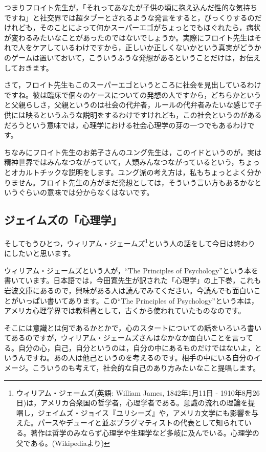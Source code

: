 \documentclass{ltjsbook}
\begin{document}
つまりフロイト先生が，「それってあなたが子供の頃に抱え込んだ性的な気持ちですね」と社交界では超タブーとされるような発言をすると，びっくりするのだけれども，そのことによって何かスーパーエゴがちょっとでもほぐれたら，病状が変わるみたいなことがあったのではないでしょうか。実際にフロイト先生はそれで人をケアしているわけですから，正しいか正しくないかという真実がどうかのゲームは置いておいて，こういうふうな発想があるということだけは，お伝えしておきます。

さて，フロイト先生もこのスーパーエゴというところに社会を見出しているわけですね。彼は臨床で個々のケースについての発想の人ですから，どちらかというと父親らしさ，父親というのは社会の代弁者，ルールの代弁者みたいな感じで子供には映るというふうな説明をするわけですけれども，この社会というのがあるだろうという意味では，心理学における社会心理学の芽の一つでもあるわけです。

ちなみにフロイト先生のお弟子さんのユング先生は，このイドというのが，実は精神世界ではみんなつながっていて，人類みんなつながっているという，ちょっとオカルトチックな説明をします。ユング派の考え方は，私もちょっとよく分かりません。フロイト先生の方がまだ発想としては，そういう言い方もあるかなというぐらいの意味では分からなくはないです。

\subsection{ジェイムズの「心理学」}

そしてもうひとつ，ウィリアム・ジェームズ\footnote{ウィリアム・ジェームズ(英語: William James, 1842年1月11日 - 1910年8月26日)は，アメリカ合衆国の哲学者，心理学者である。意識の流れの理論を提唱し，ジェイムズ・ジョイス『ユリシーズ』や，アメリカ文学にも影響を与えた。パースやデューイと並ぶプラグマティストの代表として知られている。著作は哲学のみならず心理学や生理学など多岐に及んでいる。心理学の父である。(Wikipediaより)}という人の話をして今日は終わりにしたいと思います。

ウィリアム・ジェームズという人が，``The Principles of Psychology''という本を書いています\parencite{WJames}。日本語では，今田寛先生が訳された「心理学」の上下巻，これも岩波文庫にあるので，興味がある人は読んでみてください。今読んでも面白いことがいっぱい書いてあります。この``The Principles of Psychology''という本は，アメリカ心理学界では教科書として，古くから使われていたものなのです。

そこには意識とは何であるかとかで，心のスタートについての話をいろいろ書いてあるのですが，ウィリアム・ジェームズさんはなかなか面白いことを言ってる。自分の心，自己，自分というのは，自分の中にあるものだけではないよ，というんですね。あの人は他己というのを考えるのです。相手の中にいる自分のイメージ。こういうのも考えて，社会的な自己のあり方みたいなこと提唱します。
\end{document}
